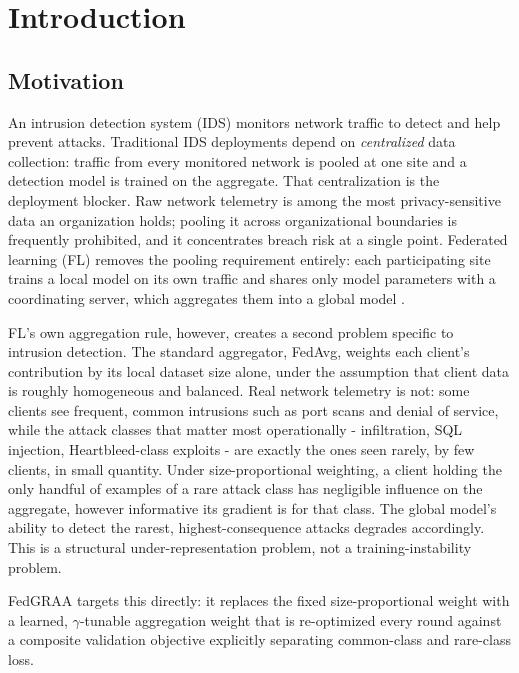 \documentclass[11pt,a4paper]{report}
\begin{document}
\clearpage
{}

\chapter{Introduction}
\label{ch:intro}

\section{Motivation}
\label{sec:motivation}

An intrusion detection system (IDS) monitors network traffic to detect and
help prevent attacks. Traditional IDS deployments depend on \emph{centralized}
data collection: traffic from every monitored network is pooled at one site
and a detection model is trained on the aggregate. That centralization is the
deployment blocker. Raw network telemetry is among the most privacy-sensitive
data an organization holds; pooling it across organizational boundaries is
frequently prohibited, and it concentrates breach risk at a single point.
Federated learning (FL) removes the pooling requirement entirely: each
participating site trains a local model on its own traffic and shares only
model parameters with a coordinating server, which aggregates them into a
global model \cite{mcmahan2017fedavg,kairouz2021fl}.

FL's own aggregation rule, however, creates a second problem specific to
intrusion detection. The standard aggregator, FedAvg, weights each client's
contribution by its local dataset size alone, under the assumption that client
data is roughly homogeneous and balanced. Real network telemetry is not: some
clients see frequent, common intrusions such as port scans and denial of
service, while the attack classes that matter most operationally -
infiltration, SQL injection, Heartbleed-class exploits - are exactly the ones
seen rarely, by few clients, in small quantity. Under size-proportional
weighting, a client holding the only handful of examples of a rare attack
class has negligible influence on the aggregate, however informative its
gradient is for that class. The global model's ability to detect the rarest,
highest-consequence attacks degrades accordingly. This is a structural
under-representation problem, not a training-instability problem.

FedGRAA \cite{fedgraa-paper} targets this directly: it replaces the fixed
size-proportional weight with a learned, $\gamma$-tunable aggregation weight
that is re-optimized every round against a composite validation objective
explicitly separating common-class and rare-class loss.
\end{document}
